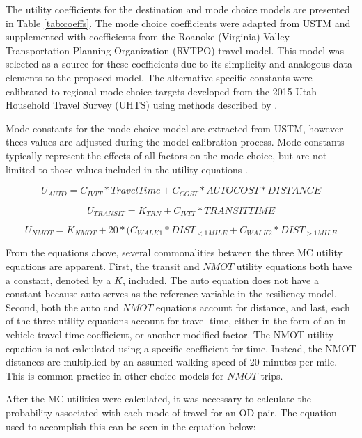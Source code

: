 The utility coefficients for the destination and mode choice models are
presented in Table \ref{tab:coeffs}. The mode choice coefficients were adapted
from USTM and supplemented with coefficients from the Roanoke (Virginia)
Valley Transportation Planning Organization (RVTPO) travel model. This model was
selected as a source for these coefficients due to its simplicity and analogous data elements to the proposed model.
The alternative-specific constants were calibrated to regional mode choice
targets developed from the 2015 Utah Household Travel Survey (UHTS) using
methods described by \cite{koppelman2006}.

Mode constants for the mode choice model are extracted from USTM, however thees values are adjusted during the model calibration process. Mode constants typically represent the effects of all factors on the mode choice, but are not limited to
those values included in the utility equations \cite{koppelman2006}.

\begin{equation}
U_{AUTO} = C_{IVTT} * Travel Time + C_{COST} * AUTOCOST * DISTANCE
	\label{eqn:auto}
\end{equation}

\begin{equation}
U_{TRANSIT} = K_{TRN} + C_{IVTT} * TRANSIT TIME
	\label{eqn:transit}
\end{equation}

\begin{equation}
U_{NMOT} = K_{NMOT} + 20 * (C_{WALK1} * DIST_{<1MILE} + C_{WALK2} * DIST_{>1MILE}
	\label{eqn:nmot}
\end{equation}

From the equations above, several commonalities between the three MC utility equations are
apparent. First, the transit and $NMOT$ utility equations both have a constant, denoted by a $K$,
included. The auto equation does not have a constant because auto serves as the reference
variable in the resiliency model. Second, both the auto and $NMOT$ equations account for
distance, and last, each of the three utility equations account for travel time, either in the
form of an in-vehicle travel time coefficient, or another modified factor. The NMOT utility
equation is not calculated using a specific coefficient for time. Instead, the NMOT distances are
multiplied by an assumed walking speed of 20 minutes per mile. This is common practice in other
choice models for $NMOT$ trips.

After the MC utilities were calculated, it was necessary to calculate the probability associated
with each mode of travel for an OD pair. The equation used to accomplish this can be seen in the
equation below:

